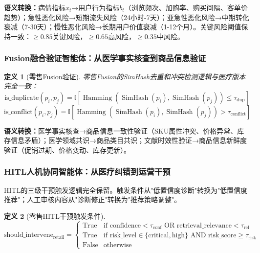 \documentclass[11pt,a4paper]{ctexart}
\newtheorem{definition}{定义}[section]
\theoremstyle{remark}
\DeclareMathOperator{\Ham}{Hamming}
\DeclareMathOperator{\simhash}{SimHash}
\begin{document}
\textbf{语义转换：}病情指标$x_t$→用户行为指标$b_t$（浏览频次、加购率、购买间隔、客单价趋势）；急性恶化风险→短期流失风险（24小时-7天）；亚急性恶化风险→中期转化衰减（7-30天）；慢性恶化风险→长期用户价值衰减（1-12个月）。关键风险阈值保持一致：$\geq 0.85$关键风险，$\geq 0.65$高风险，$\geq 0.35$中风险。

\subsubsection{Fusion融合验证智能体：从医学事实核查到商品信息验证}

\begin{definition}[零售Fusion验证]
零售Fusion的SimHash去重和冲突检测逻辑与医疗版本完全一致：
\begin{equation}
\text{is\_duplicate}(p_i, p_j) = \mathbb{I}\left[\Ham(\simhash(p_i), \simhash(p_j)) \leq \tau_{\text{dup}}\right]
\end{equation}
\begin{equation}
\text{is\_conflict}(p_i, p_j) = \mathbb{I}\left[\Ham(\simhash(p_i), \simhash(p_j)) > \tau_{\text{conflict}}\right]
\end{equation}
\end{definition}

\textbf{语义转换：}医学事实核查→商品信息一致性验证（SKU属性冲突、价格异常、库存信息矛盾）；医学领域共识→商品类目共识；文献时效性验证→商品信息新鲜度验证（促销过期、价格变动、库存更新）。

\subsubsection{HITL人机协同智能体：从医疗纠错到运营干预}

HITL的三级干预触发逻辑完全保留。触发条件从"低置信度诊断"转换为"低置信度推荐"；人工审核内容从"诊断修正"转换为"推荐策略调整"。

\begin{definition}[零售HITL干预触发条件]
\begin{equation}
\text{should\_intervene}_{\text{retail}} =
\begin{cases}
\text{True} & \text{if } \text{confidence} < \tau_{\text{conf}} \text{ OR retrieval\_relevance} < \tau_{\text{rel}} \\
\text{True} & \text{if } \text{risk\_level} \in \{\text{critical}, \text{high}\} \text{ AND risk\_score} \geq \tau_{\text{risk}} \\
\text{False} & \text{otherwise}
\end{cases}
\end{equation}
\end{definition}
\end{document}
